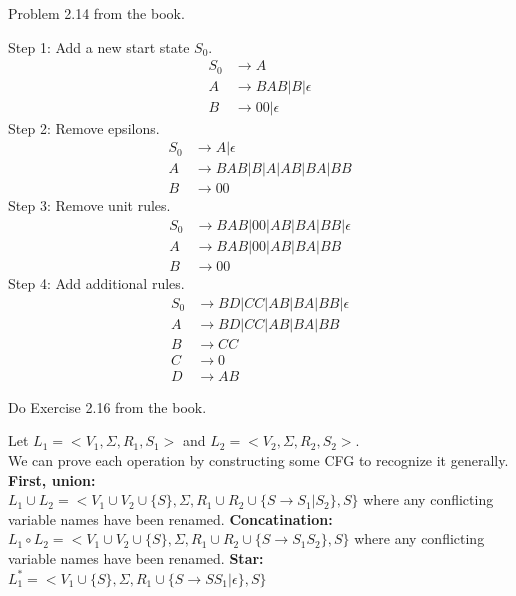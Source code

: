 \begin{problem}{4}
  Problem 2.14 from the book.
  \begin{solution}
    Step 1: Add a new start state $S_0$.
    \begin{align*}
      S_0 &\rightarrow A \\
      A &\rightarrow BAB|B|\epsilon \\
      B &\rightarrow 00|\epsilon
    \end{align*}
    Step 2: Remove epsilons.
    \begin{align*}
      S_0 &\rightarrow A | \epsilon \\
      A &\rightarrow BAB|B|A|AB|BA|BB \\
      B &\rightarrow 00
    \end{align*}
    Step 3: Remove unit rules.
    \begin{align*}
      S_0 &\rightarrow BAB|00|AB|BA|BB| \epsilon \\
      A &\rightarrow BAB|00|AB|BA|BB \\
      B &\rightarrow 00
    \end{align*}
    Step 4: Add additional rules.
    \begin{align*}
      S_0 &\rightarrow BD|CC|AB|BA|BB| \epsilon \\
      A &\rightarrow BD|CC|AB|BA|BB \\
      B &\rightarrow CC \\
      C &\rightarrow 0 \\
      D &\rightarrow AB
    \end{align*}
  \end{solution}
\end{problem}

\begin{problem}{5}
  Do Exercise 2.16 from the book.
  \begin{solution}
    Let $L_1 = <V_1, \Sigma, R_1, S_1>$ and $L_2 = <V_2, \Sigma, R_2, S_2>$. \\ We can prove each operation by
    constructing some CFG to recognize it generally.
    \br
    \textbf{First, union:} \\ $L_1 \cup L_2 = < V_1 \cup V_2 \cup \{S\}, \Sigma,
    R_1 \cup R_2 \cup \{ S \rightarrow S_1|S_2 \}, S \}$ where any conflicting variable names have been renamed.
    \br
    \textbf{Concatination:} \\
    $L_1 \circ L_2 = < V_1 \cup V_2 \cup \{S\}, \Sigma, R_1 \cup R_2 \cup \{ S \rightarrow S_1S_2 \}, S \}$
    where any conflicting variable names have been renamed.
    \br
    \textbf{Star:} \\
    $L_1^* = < V_1 \cup \{S\}, \Sigma, R_1 \cup \{ S \rightarrow SS_1|\epsilon \}, S \}$
  \end{solution}
\end{problem}

